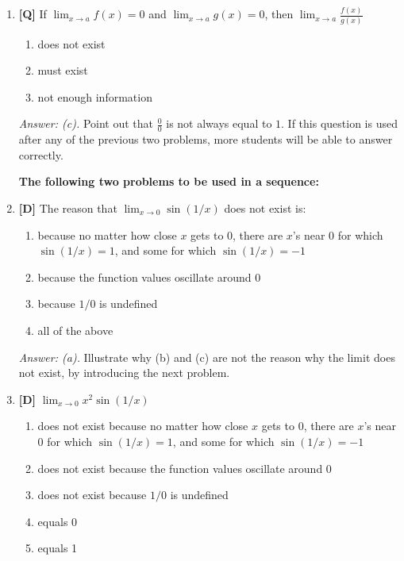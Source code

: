 \documentclass[12pt]{article}
\begin{document}
\begin{enumerate}
{\it Answer: (b).} Answers $(a)$ and $(c)$ are very popular. $f(a)$ need not be defined in order for $\displaystyle{\lim_{x\rightarrow a}f(x)}$ to exist, and it does not have to approach $\infty$. However, the limit could be 0, for example consider $f(x)=
0$ for all $x \neq a$, and $f(a)$ not defined. The student has to note the difference between "cannot", "could" and "must". 

\bigskip

\item {\bf [Q]} If $\displaystyle{\lim_{x\rightarrow a} f(x)=0}$ and 
$\displaystyle{\lim_{x\rightarrow a} g(x)=0}$, then 
$\displaystyle{\lim_{x\rightarrow a} \frac{f(x)}{g(x)}}$ 
\begin{enumerate}
\item does not exist
\item must exist
\item not enough information
\end{enumerate}
{\it Answer: (c).} Point out that $\frac{0}{0}$ is not always equal to $1$. If this question is used after any of the previous two problems, more students will be able to answer correctly.

\bigskip

{\bf The following two problems to be used in a sequence:}

\item {\bf [D]} The reason that $\displaystyle{\lim_{x\rightarrow 0}\sin (1/x)}$ does not exist is:
\begin{enumerate}
\item because no matter how close $x$ gets to $0$, there are $x$'s near $0$ for which $\sin(1/x) =1$, and some for which $\sin (1/x)=-1$
\item because the function values oscillate around $0$
\item because $1/0$ is undefined
\item all of the above
\end{enumerate}

{\it Answer: (a).} Illustrate why (b) and (c) are not the reason why the limit does not exist, by introducing the next problem.

\bigskip

\item {\bf [D]} $\displaystyle{\lim_{x\rightarrow 0}x^2\sin (1/x)}$ 
\begin{enumerate}
\item does not exist because no matter how close $x$ gets to $0$, there are $x$'s near $0$ for which $\sin(1/x) =1$, and some for which $\sin (1/x)=-1$
\item does not exist because the function values oscillate around $0$
\item does not exist because $1/0$ is undefined
\item equals 0 
\item equals 1
\end{enumerate}


\end{enumerate}
\end{document}
